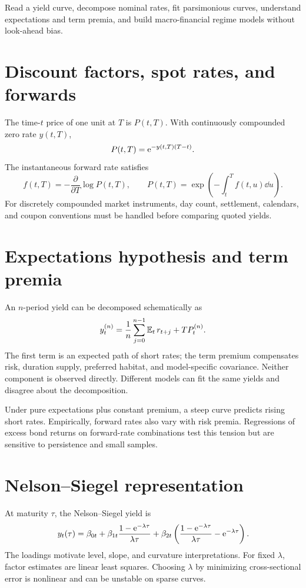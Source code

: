 \begin{objectives}
Read a yield curve, decompose nominal rates, fit parsimonious curves, understand
expectations and term premia, and build macro-financial regime models without
look-ahead bias.
\end{objectives}

\section{Discount factors, spot rates, and forwards}

The time-$t$ price of one unit at $T$ is $P(t,T)$. With continuously compounded
zero rate $y(t,T)$,
\[
P(t,T)=\mathrm e^{-y(t,T)(T-t)}.
\]
The instantaneous forward rate satisfies
\[
f(t,T)=-\frac{\partial}{\partial T}\log P(t,T),\qquad
P(t,T)=\exp\left(-\int_t^Tf(t,u)\dd u\right).
\]
For discretely compounded market instruments, day count, settlement, calendars, and
coupon conventions must be handled before comparing quoted yields.

\section{Expectations hypothesis and term premia}

An $n$-period yield can be decomposed schematically as
\[
y_t^{(n)}
=\frac1n\sum_{j=0}^{n-1}\operatorname{\mathbb E}_t r_{t+j}
+TP_t^{(n)}.
\]
The first term is an expected path of short rates; the term premium compensates risk,
duration supply, preferred habitat, and model-specific covariance. Neither component
is observed directly. Different models can fit the same yields and disagree about
the decomposition.

Under pure expectations plus constant premium, a steep curve predicts rising short
rates. Empirically, forward rates also vary with risk premia. Regressions of excess
bond returns on forward-rate combinations test this tension but are sensitive to
persistence and small samples.

\section{Nelson--Siegel representation}

At maturity $\tau$, the Nelson--Siegel yield is
\[
y_t(\tau)=\beta_{0t}
+\beta_{1t}\frac{1-\mathrm e^{-\lambda\tau}}{\lambda\tau}
+\beta_{2t}\left(
\frac{1-\mathrm e^{-\lambda\tau}}{\lambda\tau}-\mathrm e^{-\lambda\tau}
\right).
\]
The loadings motivate level, slope, and curvature interpretations. For fixed
$\lambda$, factor estimates are linear least squares. Choosing $\lambda$ by minimizing
cross-sectional error is nonlinear and can be unstable on sparse curves.

